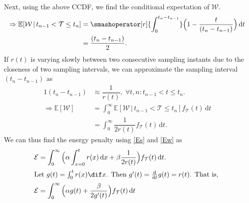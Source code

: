 Next, using the above \gls{CCDF}, we find the conditional expectation of $\mathcal{W}$.
\begin{alignat*}{1}
    \Rightarrow \mathbb{E}[\mathcal{W}\,|\,t_{n-1}<\mathcal{T}\leq t_n]&=\smashoperator[r]{\int_{0}^{t_n-t_{n-1}}}\Big(1-\dfrac{t}{(t_{n}-t_{n-1})}\Big)\,\mathrm{d}t\\
    &=\dfrac{(t_n-t_{n-1})}{2}.
\end{alignat*}
If $r(t)$ is varying slowly between two consecutive sampling instants due to the closeness of two sampling intervals, we can approximate the sampling interval $(t_n\!-\!t_{n-1})$ as
\begin{alignat}{1}
(t_n-t_{n-1})&\approx\dfrac{1}{r(t)},\;\forall t,n:t_{n-1}\!<\!t\!\leq\!t_n.\label{Apx3}\\
\Rightarrow \mathbb{E}[\mathcal{W}]&=\int_{0}^{\infty}\mathbb{E}[\mathcal{W}\,|\,t_{n-1}<\mathcal{T}\leq t_n]f_\mathcal{T}(t)\,\mathrm{d}t\nonumber\\
&=\int_{0}^{\infty}\dfrac{1}{2r(t)}f_\mathcal{T}(t)\,\mathrm{d}t.\label{Ew}
\end{alignat}
We can thus find the energy penalty using \cref{Es} and \cref{Ew} as
\begin{alignat*}{1}
    \mathcal{E}&=\int_{0}^{\infty}\Big(\alpha\int_{x=0}^{t}r(x)\,\mathrm{d}x+\beta\dfrac{1}{2r(t)}\Big)f_{\mathcal{T}}(t)\,\mathrm{d}t.\label{epsilon_eulerForm}\\
    \intertext{%
        Let $g(t)=\int_{0}^{t}r(x)\dif x$.
        Then  $g'(t)=\tfrac{\mathrm{d}}{\mathrm{d}t}g(t)=r(t)$.
        That is,
    }
    \mathcal{E}&=\int_{0}^{\infty}\Big(\alpha g(t)+\dfrac{\beta}{2g'(t)}\Big)f_{\mathcal{T}}(t)\,\mathrm{d}t
\end{alignat*}

